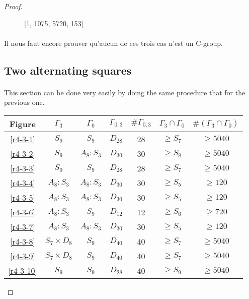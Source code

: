 \begin{proof}
\begin{figure}[H]
\begin{center}
\begin{tikzpicture}
      \end{tikzpicture}
      \caption{[1, 1075, 5720, 153]}
    \end{center}
  \end{figure}

  \paragraph{}
  Il nous faut encore prouver qu'aucun de ces trois cas n'est un C-group.

\subsection{Two alternating squares}
  \paragraph{}
  This section can be done very easily by doing the same procedure that for the previous one.

  \begin{table}[H]
    \centering
    \begin{tabular}{|c|c|c|c|c|c|c|}
      \hline
      Figure & $\Gamma_3$ & $\Gamma_0$ & $\Gamma_{0,3}$ & $\#\Gamma_{0,3}$ & $\Gamma_3 \cap \Gamma_0$ & $\#(\Gamma_3 \cap \Gamma_0)$ \\ \hline

      \ref{r4-3-1} & $S_9$ & $S_9$ & $D_{28}$ & 28 & $\ge S_7$ & $\ge 5040$ \\ \hline
      \ref{r4-3-2} & $S_9$ & $A_8 : S_3$ & $D_{30}$ & 30 & $\ge S_8$ & $\ge 5040$  \\ \hline
      \ref{r4-3-3} & $S_9$ & $S_9$ & $D_{28}$ & 28 & $\ge S_7$ & $\ge 5040$ \\ \hline
      \ref{r4-3-4} & $A_8 : S_3$ & $A_8 : S_3$ & $D_{30}$ & 30 & $\ge S_5$ & $\ge 120$ \\ \hline
      \ref{r4-3-5} & $A_8 : S_3$ & $A_8 : S_3$ & $D_{30}$ & 30 & $\ge S_5$ & $\ge 120$ \\ \hline
      \ref{r4-3-6} & $A_8 : S_3$ & $S_9$ & $D_{12}$ & 12 & $\ge S_6$ & $\ge 720$ \\ \hline
      \ref{r4-3-7} & $A_8 : S_3$ & $A_8 : S_3$ & $D_{30}$ & 30 & $\ge S_5$ & $\ge 120$  \\ \hline
      \ref{r4-3-8} & $S_7 \times D_8$ & $S_9$ & $D_{40}$ & 40 & $\ge S_7$ & $\ge 5040$ \\ \hline
      \ref{r4-3-9} & $S_7 \times D_8$ & $S_9$ & $D_{40}$ & 40 & $\ge S_7$ & $\ge 5040$ \\ \hline
      \ref{r4-3-10}& $S_9$ & $S_9$ & $D_{28}$ & 40 & $\ge S_9$ & $\ge 5040$ \\ \hline

    \end{tabular}
  \end{table}

\end{proof}

